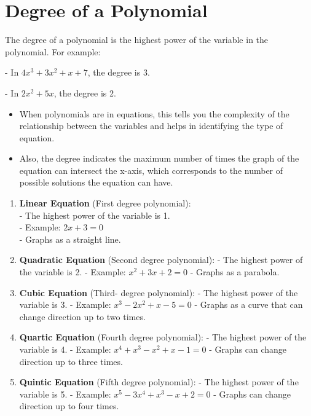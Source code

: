 \documentclass[12pt]{article}
\begin{document}
\section*{Degree of a Polynomial}
The degree of a polynomial is the highest power of the variable in the polynomial. 
For example:

- In \(4x^3 + 3x^2 + x + 7\), the degree is 3.

- In \(2x^2 + 5x\), the degree is 2.

\begin{itemize}
\item When polynomials are in equations, this tells you the complexity of the relationship between the variables and helps in identifying the type of equation. 
\item Also, the degree indicates the maximum number of times the graph of the equation can intersect the x-axis, which corresponds to the number of possible solutions the equation can have.
\end{itemize}

\begin{enumerate}
\item \textbf{Linear Equation} (First degree polynomial):\\
   - The highest power of the variable is 1.\\
   - Example: \(2x + 3 = 0\)\\
   - Graphs as a straight line.

\item \textbf{Quadratic Equation} (Second degree polynomial):
   - The highest power of the variable is 2.
   - Example: \(x^2 + 3x + 2 = 0\)
   - Graphs as a parabola.

\item \textbf{Cubic Equation} (Third- degree polynomial):
   - The highest power of the variable is 3.
   - Example: \(x^3 - 2x^2 + x - 5 = 0\)
   - Graphs as a curve that can change direction up to two times.

\item \textbf{Quartic Equation} (Fourth degree polynomial):
   - The highest power of the variable is 4.
   - Example: \(x^4 + x^3 - x^2 + x - 1 = 0\)
   - Graphs can change direction up to three times.

\item \textbf{Quintic Equation} (Fifth degree polynomial):
   - The highest power of the variable is 5.
   - Example: \(x^5 - 3x^4 + x^3 - x + 2 = 0\)
   - Graphs can change direction up to four times.
\end{enumerate}
\end{document}
